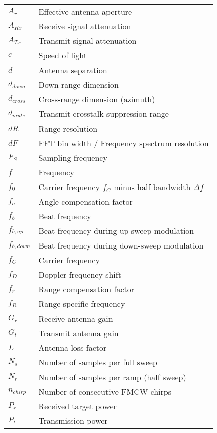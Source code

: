 \begin{listofsymbols}

\keepXColumns
\setlength{\tabcolsep}{0pt}
\begin{tabularx}{\textwidth}{%
  >{\setlength{\hsize}{3cm}\raggedright\arraybackslash}X%
  X%
}

$A_r$ & Effective antenna aperture \\
$A_{Rx}$ & Receive signal attenuation \\
$A_{Tx}$ & Transmit signal attenuation \\
$c$  & Speed of light \\
$d$  & Antenna separation \\
$d_{down}$ & Down-range dimension \\
$d_{cross}$ & Cross-range dimension (azimuth) \\
$d_{mute}$ & Transmit crosstalk suppression range \\
$dR$  & Range resolution \\
$dF$  & FFT bin width / Frequency spectrum resolution \\
$F_S$ &  Sampling frequency \\
$f$   &  Frequency \\
$f_0$ & Carrier frequency $f_C$ minus half bandwidth $\Delta f$ \\
$f_a$ & Angle compensation factor \\
$f_b$ & Beat frequency \\
$f_{b,up}$ & Beat frequency during up-sweep modulation \\
$f_{b,down}$ & Beat frequency during down-sweep modulation \\
$f_C$ & Carrier frequency \\
$f_D$ & Doppler frequency shift \\
$f_r$ & Range compensation factor \\
$f_R$ & Range-specific frequency \\
$G_r$ & Receive antenna gain \\
$G_t$ & Transmit antenna gain \\
$L$ & Antenna loss factor \\
$N_s$ & Number of samples per full sweep \\
$N_r$ & Number of samples per ramp (half sweep) \\
$n_{chirp}$ & Number of consecutive FMCW chirps \\
$P_r$ & Received target power \\
$P_t$ & Transmission power \\

\end{tabularx}
\end{listofsymbols}
